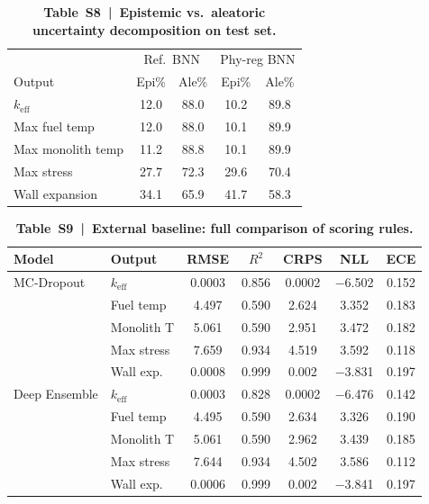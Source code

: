 \documentclass[11pt,a4paper]{article}
\newcommand{\keff}{\ensuremath{k_{\mathrm{eff}}}}
\begin{document}
\begin{table}[htbp]
\centering
\caption{\textbf{Table~S8~|~Epistemic vs.\ aleatoric uncertainty
decomposition on test set.}}
\label{tab:S8}
\smallskip
\small
\begin{tabular}{lcccc}
\toprule
 & \multicolumn{2}{c}{Ref.\ BNN} & \multicolumn{2}{c}{Phy-reg BNN} \\
Output & Epi\% & Ale\% & Epi\% & Ale\% \\
\midrule
\keff{}            & 12.0 & 88.0 & 10.2 & 89.8 \\
Max fuel temp      & 12.0 & 88.0 & 10.1 & 89.9 \\
Max monolith temp  & 11.2 & 88.8 & 10.1 & 89.9 \\
Max stress         & 27.7 & 72.3 & 29.6 & 70.4 \\
Wall expansion     & 34.1 & 65.9 & 41.7 & 58.3 \\
\bottomrule
\end{tabular}
\end{table}

\begin{table}[htbp]
\centering
\caption{\textbf{Table~S9~|~External baseline: full comparison of scoring
rules.}}
\label{tab:S9}
\smallskip
\small
\begin{tabular}{llccccc}
\toprule
Model & Output & RMSE & $R^2$ & CRPS & NLL & ECE \\
\midrule
MC-Dropout & \keff{} & 0.0003 & 0.856 & 0.0002 & $-$6.502 & 0.152 \\
           & Fuel temp   & 4.497 & 0.590 & 2.624 & 3.352 & 0.183 \\
           & Monolith T  & 5.061 & 0.590 & 2.951 & 3.472 & 0.182 \\
           & Max stress  & 7.659 & 0.934 & 4.519 & 3.592 & 0.118 \\
           & Wall exp.   & 0.0008 & 0.999 & 0.002 & $-$3.831 & 0.197 \\
\midrule
Deep Ensemble & \keff{} & 0.0003 & 0.828 & 0.0002 & $-$6.476 & 0.142 \\
              & Fuel temp   & 4.495 & 0.590 & 2.634 & 3.326 & 0.190 \\
              & Monolith T  & 5.061 & 0.590 & 2.962 & 3.439 & 0.185 \\
              & Max stress  & 7.644 & 0.934 & 4.502 & 3.586 & 0.112 \\
              & Wall exp.   & 0.0006 & 0.999 & 0.002 & $-$3.841 & 0.197 \\
\bottomrule
\end{tabular}
\end{table}
\end{document}
